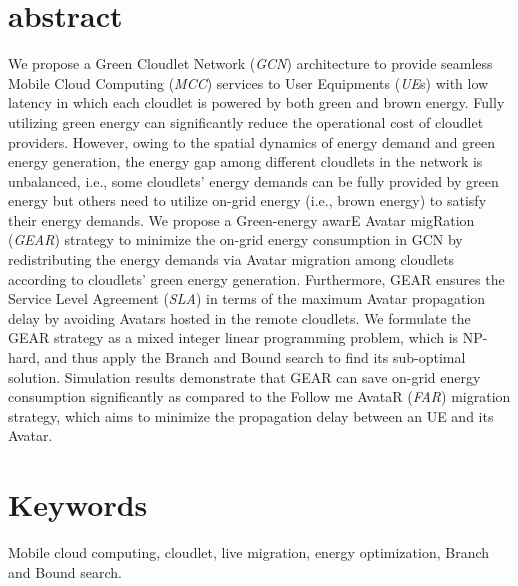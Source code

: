 \documentclass[journal,12pt,draftclsnofoot,onecolumn]{IEEEtran}
\begin{document}
\section{abstract}
We propose a Green Cloudlet Network (\emph{GCN}) architecture to provide seamless Mobile Cloud Computing (\emph{MCC}) services to User Equipments (\emph{UE}s) with low latency in which each cloudlet is powered by both green and brown energy. Fully utilizing green energy can significantly reduce the operational cost of cloudlet providers. However, owing to the spatial dynamics of energy demand and green energy generation, the energy gap among different cloudlets in the network is unbalanced, i.e., some cloudlets' energy demands can be fully provided by green energy but others need to utilize on-grid energy (i.e., brown energy) to satisfy their energy demands. We propose a Green-energy awarE Avatar migRation (\emph{GEAR}) strategy to minimize the on-grid energy consumption in GCN by redistributing the energy demands via Avatar migration among cloudlets according to cloudlets' green energy generation. Furthermore, GEAR ensures the Service Level Agreement (\emph{SLA}) in terms of the maximum Avatar propagation delay by avoiding Avatars hosted in the remote cloudlets. We formulate the GEAR strategy as a mixed integer linear programming problem, which is NP-hard, and thus apply the Branch and Bound search to find its sub-optimal solution. Simulation results demonstrate that GEAR can save on-grid energy consumption significantly as compared to the Follow me AvataR (\emph{FAR}) migration strategy, which aims to minimize the propagation delay between an UE and its Avatar. 


\section{Keywords}
Mobile cloud computing, cloudlet, live migration, energy optimization, Branch and Bound search.\
\end{document}
